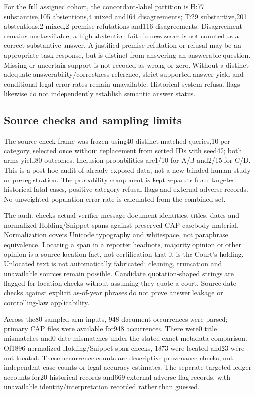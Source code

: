 For the full assigned cohort, the concordant-label partition is H:77 substantive,105 abstentions,4 mixed and164 disagreements; T:29 substantive,201 abstentions,2 mixed,2 premise refutations and116 disagreements. Disagreement remains unclassifiable; a high abstention faithfulness score is not counted as a correct substantive answer. A justified premise refutation or refusal may be an appropriate task response, but is distinct from answering an answerable question. Missing or uncertain support is not recoded as wrong or zero. Without a distinct adequate answerability/correctness reference, strict supported-answer yield and conditional legal-error rates remain unavailable. Historical system refusal flags likewise do not independently establish semantic answer status.

\subsection{Source checks and sampling limits}
The source-check frame was frozen using40 distinct matched queries,10 per category, selected once without replacement from sorted IDs with seed42; both arms yield80 outcomes. Inclusion probabilities are1/10 for A/B and2/15 for C/D. This is a post-hoc audit of already exposed data, not a new blinded human study or preregistration. The probability component is kept separate from targeted historical fatal cases, positive-category refusal flags and external adverse records. No unweighted population error rate is calculated from the combined set.

The audit checks actual verifier-message document identities, titles, dates and normalized Holding/Snippet spans against preserved CAP casebody material. Normalization covers Unicode typography and whitespace, not paraphrase equivalence. Locating a span in a reporter headnote, majority opinion or other opinion is a source-location fact, not certification that it is the Court's holding. Unlocated text is not automatically fabricated: cleaning, truncation and unavailable sources remain possible. Candidate quotation-shaped strings are flagged for location checks without assuming they quote a court. Source-date checks against explicit as-of-year phrases do not prove answer leakage or controlling-law applicability.

Across the80 sampled arm inputs, 948 document occurrences were parsed; primary CAP files were available for948 occurrences. There were0 title mismatches and0 date mismatches under the stated exact metadata comparison. Of1896 normalized Holding/Snippet span checks, 1873 were located and23 were not located. These occurrence counts are descriptive provenance checks, not independent case counts or legal-accuracy estimates. The separate targeted ledger accounts for20 historical records and669 external adverse-flag records, with unavailable identity/interpretation recorded rather than guessed.

